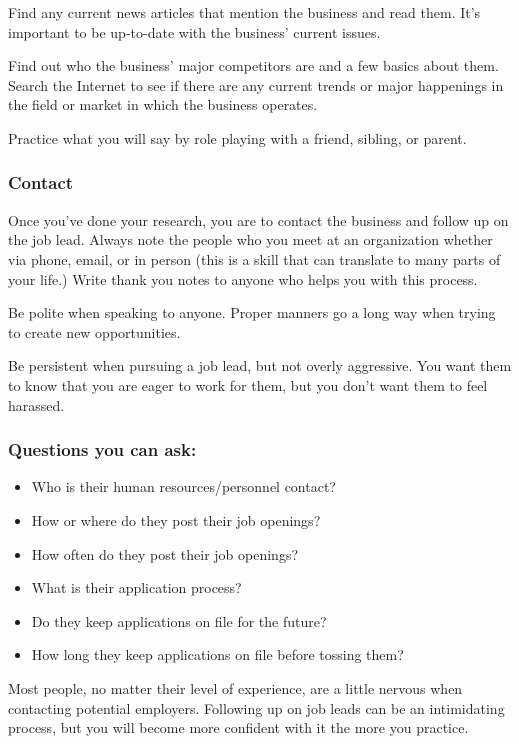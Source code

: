 Find any current news articles that mention the business and read them. It's important to be up-to-date with the business' current issues.

Find out who the business’ major competitors are and a few basics about them.
Search the Internet to see if there are any current trends or major happenings in the field or market in which the business operates.

Practice what you will say by role playing with a friend, sibling, or parent.

\subsubsection*{Contact}

Once you've done your research, you are to contact the business and follow up on the job lead. Always note the people who you meet at an organization whether via phone, email, or in person (this is a skill that can translate to many parts of your life.) Write thank you notes to anyone who helps you with this process.

Be polite when speaking to anyone. Proper manners go a long way when trying to create new opportunities.

Be persistent when pursuing a job lead, but not overly aggressive. You want them to know that you are eager to work for them, but you don't want them to feel harassed.

\subsubsection*{Questions you can ask:}
\begin{itemize}[leftmargin=1.0cm]
	\item Who is their human resources/personnel contact?
	\item How or where do they post their job openings?
	\item How often do they post their job openings?
	\item What is their application process?
	\item Do they keep applications on file for the future?
	\item How long they keep applications on file before tossing them?
\end{itemize}
Most people, no matter their level of experience, are a little nervous when contacting potential employers. Following up on job leads can be an intimidating process, but you will become more confident with it the more you practice.

